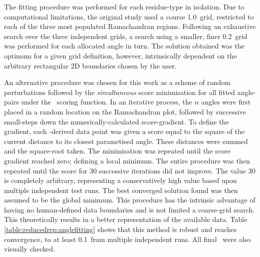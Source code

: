 The fitting procedure was performed for each residue-type in isolation. Due to computational limitations, the original study used a course 1.0\degree\ grid, restricted to each of the three most populated Ramachandran regions. Following an exhaustive search over the three independent grids, a search using a smaller, finer 0.2\degree\ grid was performed for each allocated angle in turn. The solution obtained was the optimum for a given grid definition, however, intrinsically dependent on the arbitrary rectangular 2D boundaries chosen by the user. 

 An alternative procedure was chosen for this work as a scheme of random perturbations followed by the \emph{simultaneous} score minimisation for all fitted angle-pairs under the \raft\ scoring function.  In an iterative process, the $n$ angles were first placed in a random location on the Ramachandran plot,  followed by successive small-steps down the numerically-calculated score-gradient. To define the gradient, each \thothloopdb -derived data point was given a score equal to the square of the current distance to its closest parametised angle.
These distances were summed and the square-root taken. The minimisation was repeated until the score gradient reached zero; defining a local minimum. The entire procedure was then repeated until the score for 30 successive iterations did not improve. The value 30 is completely arbitrary, representing a conservatively high value based upon multiple independent test runs. The best converged solution found was then assumed to be the global minimum. This procedure has the intrinsic advantage of having no human-defined data boundaries and is not limited a coarse-grid search. This theoretically results in a better representation of the available data. Table \ref{table:reducedrep:anglefitting} shows that this method is robust and reaches convergence, to at least 0.1\degree\ from multiple independent runs.
All final \anglesets\ were also visually checked.

